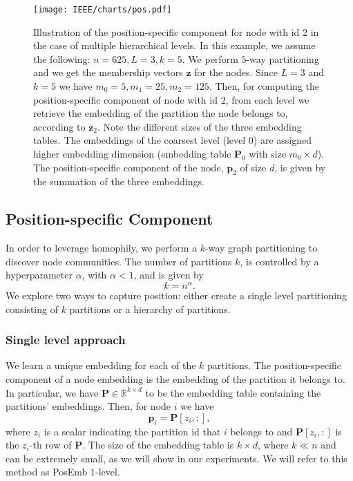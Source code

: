 \documentclass[conference]{IEEEtran}
\begin{document}
\begin{figure*}[!t]
\centerline{\texttt{[image: IEEE/charts/pos.pdf]}}
\caption{Illustration of the position-specific component for node with id $2$ in the case of multiple hierarchical levels. In this example, we assume the following: $n=625, L=3, k=5$. We perform $5$-way partitioning and we get the membership vectors $\mathbf{z}$ for the nodes. Since $L=3$ and $k=5$ we have $m_0=5, m_1=25, m_2=125$. Then, for computing the position-specific component of node with id $2$, from each level we retrieve the embedding of the partition the node belongs to, according to $\mathbf{z}_2$. Note the different sizes of the three embedding tables. The embeddings of the coarsest level (level 0) are assigned higher embedding dimension (embedding table $\mathbf{P}_0$ with size $m_0 \times d$).  
The position-specific component of the node, $\mathbf{p}_2$ of size $d$, is given by the summation of the three embeddings.}
\label{fig:position_comp}
\end{figure*}
% 
\subsection{Position-specific Component}
\label{sec:topology}
In order to leverage homophily, 
we perform a $k$-way graph partitioning to discover node communities.
The number of partitions $k$, is controlled by a hyperparameter $\alpha$, with $\alpha < 1$, and is given by
\begin{equation}
\label{k}
    k=n^{\alpha}.
\end{equation}
We explore two ways to capture position: either create a single level partitioning consisting of $k$ partitions or a hierarchy of partitions. 
% 

\subsubsection{Single level approach}
We learn a unique embedding for each of the $k$ partitions. The position-specific component of a node embedding is the embedding of the partition it belongs to. In particular, we have $\mathbf{P}\in \mathbb{R}^{k\times d}$ to be the embedding table containing the partitions' embeddings. Then, for node $i$ we have
\begin{equation}
    \mathbf{p}_i = \mathbf{P}[z_i, :],
\end{equation}
where $z_i$ is a scalar indicating the partition id that $i$ belongs to and $\mathbf{P}[z_i, :]$ is the $z_i$-th row of $\mathbf{P}$. 
The size of the embedding table is $k \times d$, where $k \ll n$ and can be extremely small, as we will show in our experiments. We will refer to this method as PosEmb $1$-level.
% 
\end{document}
